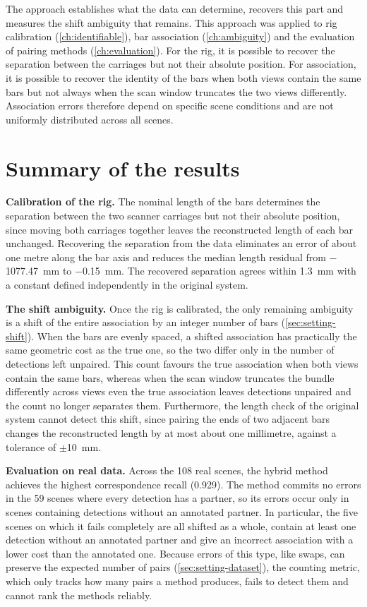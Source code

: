\documentclass[a4paper, 12pt, twoside]{book}
\begin{document}
The approach establishes what the data can determine, recovers this part and measures the shift ambiguity that remains. This approach was applied to rig calibration (\cref{ch:identifiable}), bar association (\cref{ch:ambiguity}) and the evaluation of pairing methods (\cref{ch:evaluation}). For the rig, it is possible to recover the separation between the carriages but not their absolute position. For association, it is possible to recover the identity of the bars when both views contain the same bars but not always when the scan window truncates the two views differently. Association errors therefore depend on specific scene conditions and are not uniformly distributed across all scenes.

\section{Summary of the results}
\label{sec:concl-summary}

\textbf{Calibration of the rig.} The nominal length of the bars determines the separation between the two scanner carriages but not their absolute position, since moving both carriages together leaves the reconstructed length of each bar unchanged. Recovering the separation from the data eliminates an error of about one metre along the bar axis and reduces the median length residual from $-$1077.47~mm to $-$0.15~mm. The recovered separation agrees within 1.3~mm with a constant defined independently in the original system.

\textbf{The shift ambiguity.} Once the rig is calibrated, the only remaining ambiguity is a shift of the entire association by an integer number of bars (\cref{sec:setting-shift}). When the bars are evenly spaced, a shifted association has practically the same geometric cost as the true one, so the two differ only in the number of detections left unpaired. This count favours the true association when both views contain the same bars, whereas when the scan window truncates the bundle differently across views even the true association leaves detections unpaired and the count no longer separates them. Furthermore, the length check of the original system cannot detect this shift, since pairing the ends of two adjacent bars changes the reconstructed length by at most about one millimetre, against a tolerance of $\pm$10~mm.

\textbf{Evaluation on real data.} Across the 108 real scenes, the hybrid method achieves the highest correspondence recall (0.929). The method commits no errors in the 59 scenes where every detection has a partner, so its errors occur only in scenes containing detections without an annotated partner. In particular, the five scenes on which it fails completely are all shifted as a whole, contain at least one detection without an annotated partner and give an incorrect association with a lower cost than the annotated one. Because errors of this type, like swaps, can preserve the expected number of pairs (\cref{sec:setting-dataset}), the counting metric, which only tracks how many pairs a method produces, fails to detect them and cannot rank the methods reliably.
\end{document}
